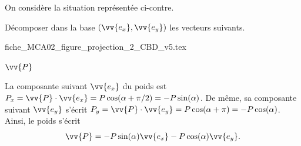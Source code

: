                                 \initialisationPartieGauche %
On considère la situation représentée ci-contre.

Décomposer dans la base $(\vv{e_x}, \vv{e_y})$ les vecteurs suivants.
                                \initialisationPartieDroite %
\begin{center}
{fiche_MCA02_figure_projection_2_CBD_v5.tex}
\end{center}
                               \finalisationDuPartageDePage %

\medskip


\debutEntrainement

\begin{enonce}
	$\vv{P}$
\end{enonce}


\begin{corrige}
La composante suivant $\vv{e_x}$ du poids est $P_x=\vv{P}\cdot \vv{e_x}=P\cos(\alpha+\pi/2)=-P\sin(\alpha)$. De même, sa composante suivant $\vv{e_y}$ s'écrit $P_y=\vv{P}\cdot \vv{e_y}=P\cos(\alpha+\pi)=-P\cos(\alpha)$. Ainsi, le poids s'écrit 
\[
\vv{P} = - P \sin(\alpha)\vv{e_x} - P \cos (\alpha) \vv{e_y}.
\]
\end{corrige}

